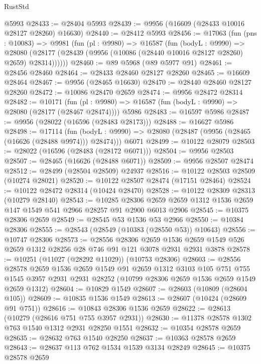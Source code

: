\begin{lexlean}{RustStd}
\begin{coremodule}
    @5993
@28433 := @28404 @5993
@28439 := @9956 (@16609 (@28433 @10016 @28127 @28260) @16630)
@28440 := @28412 @5993
@28456 := @17063
    (fun (pns : @10083) =>
    @9981
      (fun (pl : @9980) =>
      @16587
        (fun (bodyL : @9990) =>
        @28080 (@28177 (@28439 (@9956 (@10086 (@28440 @10016 @28127 @28260) @2659) @28314))))))
@28460 := @89 @5968 (@89 @5977 @91)
@28461 := @28456 @28460
@28464 := @28433 @28460 @28127 @28260
@28465 := @16609 @28464
@28467 := @9956 (@28465 @16630)
@28470 := @28440 @28460 @28127 @28260
@28472 := @10086 @28470 @2659
@28474 := @9956 @28472 @28314
@28482 := @10171
    (fun (pl : @9980) => @16587 (fun (bodyL : @9990) => @28080 (@28177 (@28467 @28474))))
    @5986
@28483 := @16597 @5986
@28487 := @9956 (@28022 (@16596 (@28483 @28173)))
@28488 := @16627 @5986
@28498 := @17114
    (fun (bodyL : @9990) => @28080 (@28487 (@9956 (@28465 (@16626 (@28488 @9974))) @28474)))
    @6071
@28499 := @10122 @28079
@28503 := @28022 (@16596 (@28483 (@28172 @6071)))
@28504 := @9956 @28503
@28507 := @28465 (@16626 (@28488 @6071))
@28509 := @9956 @28507 @28474
@28512 := @28499 (@28504 @28509) @24937
@28516 := @10122 @28503 @28509 (@10274 @28021)
@28520 := @10122 @28507 @28474 (@17151 @28464)
@28524 := @10122 @28472 @28314 (@10424 @28470)
@28528 := @10122 @28309 @28313 (@10279 @28140)
@28543 := @10285
    @28306
    @2659
    @2659
    @1312
    @1536
    @2659
    @147
    @1549
    @541
    @2966
    @28257
    @91
    @2900
    @6013
    @2906
@28545 := @10375 @28306 @2659
@28549 := @28545 @53 @1536 @53 @2966
@28550 := @10384 @28306
@28555 := @28543 (@28549 (@10383 (@28550 @53)) @10643)
@28556 := @10747 @28306
@28573 := @28556
    @28306
    @2659
    @1536
    @2659
    @1549
    @526
    @2659
    @1312
    @28256
    @28
    @746
    @91
    @121
    @3078
    @2931
    @2931
    @3878
@28578 := @10251 (@11027 (@28292 @11029)) (@10753 @28306)
@28603 := @28556
    @28578
    @2659
    @1536
    @2659
    @1549
    @91
    @2659
    @1312
    @3103
    @105
    @751
    @755
    @1545
    @3957
    @2931
    @2931
    @28252
    (@10799 @28306 @2659 @1536 @2659 @1549 @2659 @1312)
@28604 := @10829 @1549
@28607 := @28603 (@10809 (@28604 @105))
@28609 := @10835 @1536 @1549
@28613 := @28607 (@10424 (@28609 @91 @751))
@28616 := @10843 @28306 @1536 @2659
@28622 := @28613 (@10279 (@28616 @751 @755 @3957 @2931))
@28630 := @11378 @28578 @1302 @763 @1540 @1312 @2931 @28250 @1551
@28632 := @10354 @28578 @2659
@28635 := @28632 @763 @1540 @28250
@28637 := @10363 @28578 @2659
@28643 := @28637 @113 @762 @1534 @1539 @3134 @28249
@28645 := @10375 @28578 @2659

\end{coremodule}
\end{lexlean}
